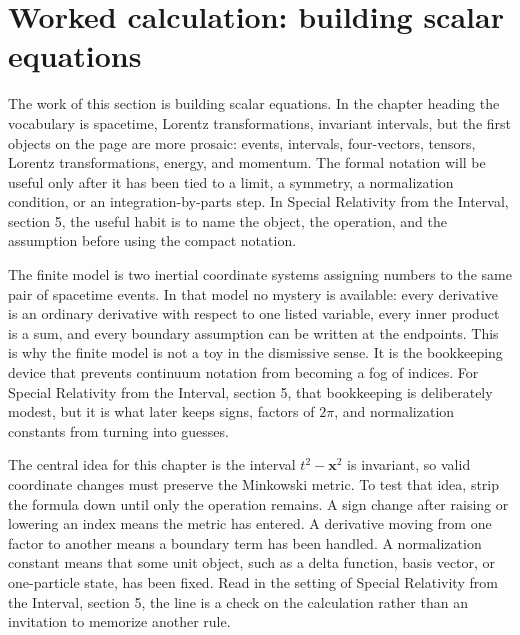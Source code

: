 \section{Worked calculation: building scalar equations}













The work of this section is building scalar equations.  In the chapter heading the vocabulary is spacetime, Lorentz transformations, invariant intervals, but the first objects on the page are more prosaic: events, intervals, four-vectors, tensors, Lorentz transformations, energy, and momentum.  The formal notation will be useful only after it has been tied to a limit, a symmetry, a normalization condition, or an integration-by-parts step.  In Special Relativity from the Interval, section 5, the useful habit is to name the object, the operation, and the assumption before using the compact notation.

The finite model is two inertial coordinate systems assigning numbers to the same pair of spacetime events.  In that model no mystery is available: every derivative is an ordinary derivative with respect to one listed variable, every inner product is a sum, and every boundary assumption can be written at the endpoints.  This is why the finite model is not a toy in the dismissive sense.  It is the bookkeeping device that prevents continuum notation from becoming a fog of indices.  For Special Relativity from the Interval, section 5, that bookkeeping is deliberately modest, but it is what later keeps signs, factors of \(2\pi\), and normalization constants from turning into guesses.

The central idea for this chapter is the interval \(t^2-\bm x^2\) is invariant, so valid coordinate changes must preserve the Minkowski metric.  To test that idea, strip the formula down until only the operation remains.  A sign change after raising or lowering an index means the metric has entered.  A derivative moving from one factor to another means a boundary term has been handled.  A normalization constant means that some unit object, such as a delta function, basis vector, or one-particle state, has been fixed.  Read in the setting of Special Relativity from the Interval, section 5, the line is a check on the calculation rather than an invitation to memorize another rule.

